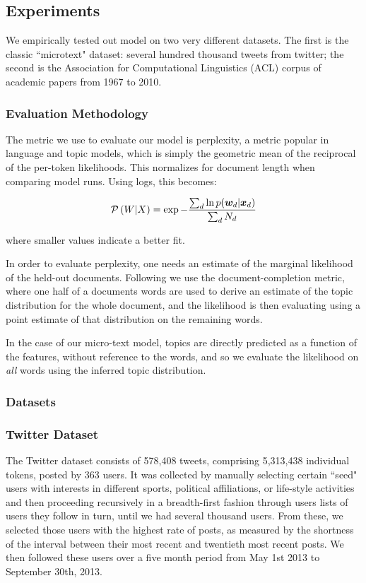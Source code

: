 \subsection{Experiments}
We empirically tested out model on two very different datasets. The first is the classic ``microtext" dataset: several hundred thousand tweets from twitter; the second is the Association for Computational Linguistics (ACL) corpus of academic papers from 1967 to 2010.

\subsubsection*{Evaluation Methodology}
The metric we use to evaluate our model is perplexity, a metric popular in language and topic models, which is simply the geometric mean of the reciprocal of the per-token likelihoods. This normalizes for document length when comparing model runs. Using logs, this becomes:

\newcommand \perplx[1] { \mathcal{P} \left( #1 \right) }

\begin{equation}
\perplx{W|X} = \exp - \frac{\sum_d \ln p(\vv{w}_d|\xd)}{\sum_d N_d} \label{eqn:perp_def}
\end{equation}

where smaller values indicate a better fit. 

In order to evaluate perplexity, one needs an estimate of the marginal likelihood of the held-out documents. Following \cite{Asuncion2012}\cite{Wallach2009b} we use the document-completion metric, where one half of a documents words are used to derive an estimate of the topic distribution for the whole document, and the likelihood is then evaluating using a point estimate of that distribution on the remaining words.

In the case of our micro-text model, topics are directly predicted as a function of the features, without reference to the words, and so we evaluate the likelihood on \emph{all} words using the inferred topic distribution.


\subsubsection{Datasets}
\subsubsection*{Twitter Dataset}
The Twitter dataset consists of 578,408 tweets, comprising 5,313,438 individual tokens, posted by 363 users. It was collected by manually selecting certain ``seed" users with interests in different sports, political affiliations, or life-style activities and then proceeding recursively in a breadth-first fashion through users lists of users they follow in turn, until we had several thousand users. From these, we selected those users with the highest rate of posts, as measured by the shortness of the interval between their most recent and twentieth most recent posts. We then followed these users over a five month period from May 1st 2013 to September 30th, 2013. 

